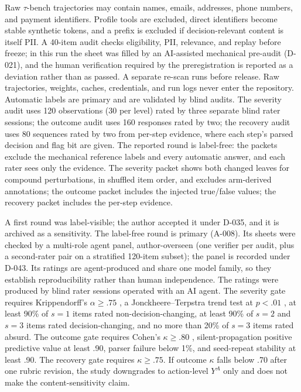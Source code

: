 \documentclass[a4paper,fleqn]{cas-sc}
\begin{document}
Raw $\tau$-bench trajectories may contain names, emails, addresses, phone numbers, and payment
identifiers. Profile tools are excluded, direct identifiers become stable synthetic tokens, and a
prefix is excluded if decision-relevant content is itself PII. A 40-item audit checks
eligibility, PII, relevance, and replay before freeze; in this run the sheet was filled by an
AI-assisted mechanical pre-audit (D-021), and the human verification required by the
preregistration is reported as a deviation rather than as passed. A separate re-scan runs before
release.
Raw trajectories, weights, caches, credentials, and run logs never enter the repository.
Automatic labels are primary and are validated by blind audits. The severity audit uses 120
observations (30 per level) rated by three separate blind rater sessions; the outcome audit
uses 160 responses rated by two; the recovery audit uses 80 sequences rated by two from per-step
evidence, where each step's parsed decision and flag bit are given. The reported round is
label-free: the packets exclude the mechanical reference labels and every automatic answer, and
each rater sees only the evidence. The severity packet shows both changed leaves for compound
perturbations, in shuffled item order, and excludes arm-derived annotations; the outcome packet
includes the injected true/false values; the recovery packet includes the per-step evidence.

A first round was label-visible; the author accepted it under
D-035, and it is archived as a sensitivity. The label-free round is primary (A-008). Its sheets were
checked by a multi-role agent panel, author-overseen (one verifier per audit, plus a second-rater
pair on a stratified 120-item subset); the panel is recorded under D-043. Its ratings are agent-produced and share one model
family, so they establish reproducibility rather than human independence.
The ratings were produced by blind rater sessions operated with an AI agent. The severity gate
requires Krippendorff's $\alpha \ge .75$ \cite{krippendorff}, a Jonckheere--Terpstra trend test at
$p<.01$ \cite{jonckheere1954}, at least 90\% of $s=1$ items rated non-decision-changing, at least
90\% of $s=2$ and $s=3$ items rated decision-changing, and no more than 20\% of $s=3$ items rated
absurd. The outcome gate requires Cohen's $\kappa \ge .80$ \cite{cohen1960}, silent-propagation
positive predictive value at least .90, parser failure below 1\%, and seed-repeat stability at
least .90. The recovery gate requires $\kappa \ge .75$. If outcome $\kappa$ falls below .70 after
one rubric revision, the study downgrades to action-level $Y^{A}$ only and does not make the
content-sensitivity claim.
\end{document}
